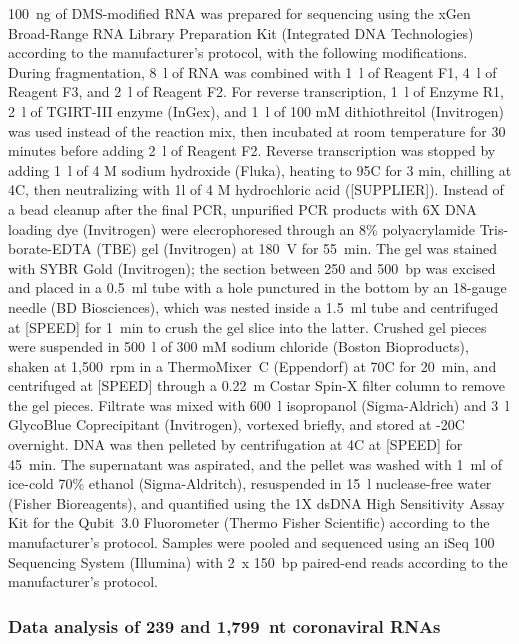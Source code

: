 \documentclass[main.tex]{subfiles}
\begin{document}
100~ng of DMS-modified RNA was prepared for sequencing using the xGen Broad-Range RNA Library Preparation Kit (Integrated DNA Technologies) according to the manufacturer’s protocol, with the following modifications.
During fragmentation, 8~\textmu l of RNA was combined with 1~\textmu l of Reagent F1, 4~\textmu l of Reagent F3, and 2~\textmu l of Reagent F2. 
For reverse transcription, 1~\textmu l of Enzyme R1, 2~\textmu l of TGIRT-III enzyme (InGex), and 1~\textmu l of 100 mM dithiothreitol (Invitrogen) was used instead of the reaction mix, then incubated at room temperature for 30 minutes before adding 2~\textmu l of Reagent F2.
Reverse transcription was stopped by adding 1~\textmu l of 4 M sodium hydroxide (Fluka), heating to 95\textdegree C for 3 min, chilling at 4\textdegree C, then neutralizing with 1\textmu l of 4 M hydrochloric acid ([SUPPLIER]).
Instead of a bead cleanup after the final PCR, unpurified PCR products with 6X DNA loading dye (Invitrogen) were elecrophoresed through an 8\% polyacrylamide Tris-borate-EDTA (TBE) gel (Invitrogen) at 180~V for 55~min.
The gel was stained with SYBR Gold (Invitrogen); the section between 250 and 500~bp was excised and placed in a 0.5~ml tube with a hole punctured in the bottom by an 18-gauge needle (BD Biosciences), which was nested inside a 1.5~ml tube and centrifuged at [SPEED] for 1~min to crush the gel slice into the latter.
Crushed gel pieces were suspended in 500~\textmu l of 300 mM sodium chloride (Boston Bioproducts), shaken at 1,500~rpm in a ThermoMixer~C (Eppendorf) at 70\textdegree C for 20~min, and centrifuged at [SPEED] through a 0.22~\textmu m Costar Spin-X filter column to remove the gel pieces.
Filtrate was mixed with 600~\textmu l isopropanol (Sigma-Aldrich) and 3~\textmu l GlycoBlue Coprecipitant (Invitrogen), vortexed briefly, and stored at -20\textdegree C overnight.
DNA was then pelleted by centrifugation at 4\textdegree C at [SPEED] for 45~min.
The supernatant was aspirated, and the pellet was washed with 1~ml of ice-cold 70\% ethanol (Sigma-Aldritch), resuspended in 15~\textmu l nuclease-free water (Fisher Bioreagents), and quantified using the 1X dsDNA High Sensitivity Assay Kit for the Qubit~3.0 Fluorometer (Thermo Fisher Scientific) according to the manufacturer's protocol.
Samples were pooled and sequenced using an iSeq 100 Sequencing System (Illumina) with 2~x 150~bp paired-end reads according to the manufacturer's protocol.

\subsubsection{Data analysis of 239 and 1,799~nt coronaviral RNAs}
\end{document}
